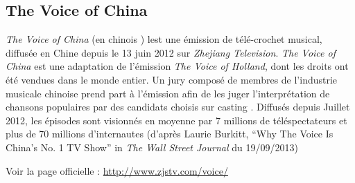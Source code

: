 \clearpage
\subsection*{The Voice of China}

\textit{The Voice of China} (en chinois ) lest une émission de télé-crochet musical, diffusée en Chine depuis le 13 juin 2012 sur \textit{Zhejiang Television}. \textit{The Voice of China} est une adaptation de l'émission \textit{The Voice of Holland}, dont les droits ont été vendues dans le monde entier. Un jury composé de membres de l'industrie musicale chinoise prend part à l'émission afin de les juger l'interprétation de chansons populaires par des candidats choisis sur casting . Diffusés depuis Juillet 2012, les épisodes sont visionnés en moyenne par 7 millions de téléspectateurs et plus de 70 millions d'internautes (d'après Laurie Burkitt, ``Why The Voice Is China's No. 1 TV Show'' in \textit{The Wall Street Journal} du 19/09/2013)

Voir la page officielle : \url{http://www.zjstv.com/voice/}

